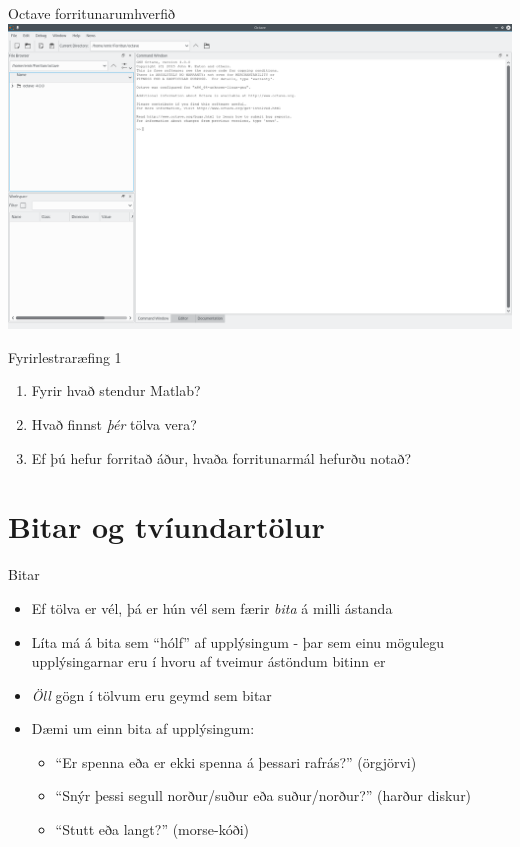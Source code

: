 \documentclass[handout]{beamer}
\begin{document}
\begin{frame}{Octave forritunarumhverfið}
\includegraphics[width=\linewidth]{Pics/Octave4}
\end{frame}

\begin{frame}{Fyrirlestraræfing 1}
\begin{enumerate}
 \item Fyrir hvað stendur Matlab?
 \item Hvað finnst \emph{þér} tölva vera?
 \item Ef þú hefur forritað áður, hvaða forritunarmál hefurðu notað?
\end{enumerate}
\end{frame}


\section{Bitar og tvíundartölur}

\begin{frame}{Bitar}
\begin{itemize} 
 \item Ef tölva er vél, þá er hún vél sem færir \emph{bita} á milli ástanda
 \item Líta má á bita sem ``hólf'' af upplýsingum - þar sem einu mögulegu upplýsingarnar eru í hvoru af tveimur ástöndum bitinn er
 \item \emph{Öll} gögn í tölvum eru geymd sem bitar
 \item Dæmi um einn bita af upplýsingum:
 \begin{itemize}
  \item ``Er spenna eða er ekki spenna á þessari rafrás?'' (örgjörvi)
  \item ``Snýr þessi segull norður/suður eða suður/norður?'' (harður diskur)
  \item ``Stutt eða langt?'' (morse-kóði)
 \end{itemize}
\end{itemize}
\end{frame}
\end{document}
